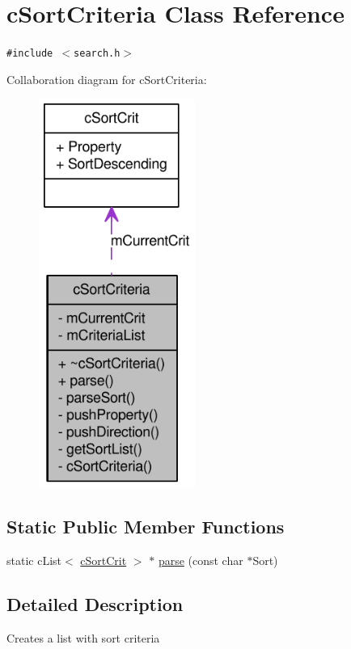 \hypertarget{classcSortCriteria}{
\section{cSortCriteria Class Reference}
\label{classcSortCriteria}
}
{\tt \#include $<$search.h$>$}

Collaboration diagram for cSortCriteria:\nopagebreak
\begin{figure}[H]
\begin{center}
\leavevmode
\includegraphics[width=145pt]{classcSortCriteria__coll__graph}
\end{center}
\end{figure}
\subsection*{Static Public Member Functions}
\begin{CompactItemize}
\item 
static cList$<$ \hyperlink{structcSortCrit}{cSortCrit} $>$ $\ast$ \hyperlink{classcSortCriteria_818579ec634d8b6f670a55545970b9e7}{parse} (const char $\ast$Sort)
\end{CompactItemize}


\subsection{Detailed Description}
Creates a list with sort criteria

